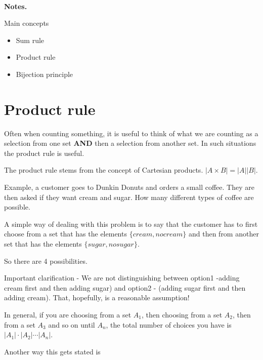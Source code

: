 \documentclass[12pt]{article}
\begin{document}
\begin{center}
\\
\vspace{1cm}
\end{center}


\medskip\noindent

{\bf Notes.}

Main concepts

\begin{itemize}
\item Sum rule
\item Product rule
\item Bijection principle
\end{itemize}

\vspace{0.5cm}\noindent

\section*{Product rule}
Often when counting something, it is useful to think of what we are counting as a selection from one set \textbf{AND} then a selection from another set. In such situations the product rule is useful.

The product rule stems from the concept of Cartesian products. $|A \times B| = |A||B|$.
 
Example, a customer goes to Dunkin Donuts and orders a small coffee. They are then asked if they want cream and sugar. How many different types of coffee are possible.

A simple way of dealing with this problem is to say that the customer has to first choose from a set that has the elements $\{cream, no cream\}$ and then from another set that has the elements $\{sugar, no sugar\}$.

So there are 4 possibilities.

Important clarification - We are not distinguishing between option1 -adding cream first and then adding sugar) and option2 - (adding sugar first and then adding cream). That, hopefully, is a reasonable assumption!

In general, if you are choosing from a set $A_1$, then choosing from a set $A_2$, then from a set $A_3$ and so on until $A_n$, the total number of choices you have is $|A_1|\cdot |A_2|\cdots |A_n|$.

\vspace{0.7cm}
Another way this gets stated is
\end{document}
